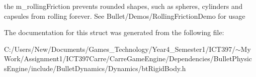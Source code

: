 the m\_\-rollingFriction prevents rounded shapes, such as spheres, cylinders and capsules from rolling forever. See Bullet/Demos/RollingFrictionDemo for usage 

The documentation for this struct was generated from the following file:\begin{CompactItemize}
\item 
C:/Users/New/Documents/Games\_\-Technology/Year4\_\-Semester1/ICT397/$\sim$My Work/Assignment1/ICT397Carre/CarreGameEngine/Dependencies/BulletPhysicsEngine/include/BulletDynamics/Dynamics/btRigidBody.h\end{CompactItemize}
